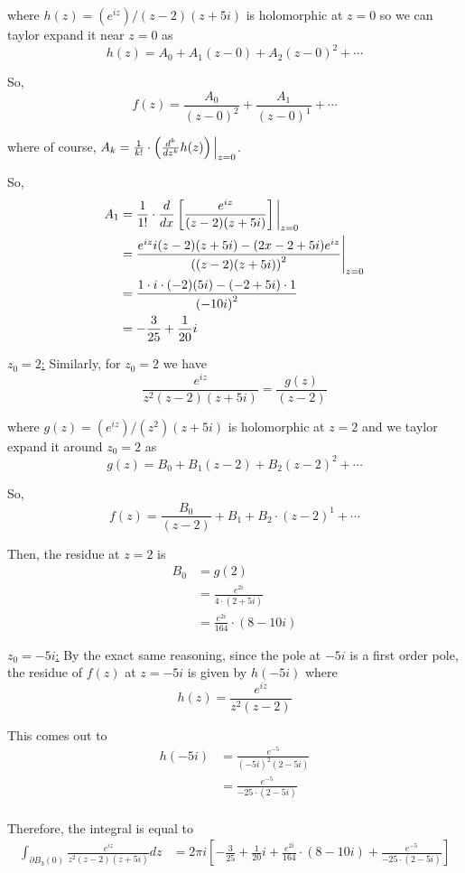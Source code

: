 \documentclass{article}
\newcommand{\restr}[2]{{%
  \left.\kern-\nulldelimiterspace %
  #1 %
  \vphantom{\big|} %
  \right|_{#2} %
  }}
\begin{document}
where $h(z) = (e^{iz}) / (z-2)(z+5i)$ is holomorphic at $z = 0$ so we can taylor expand it near $z = 0$ as 
\[ h(z) = A_0 + A_1(z-0) + A_2(z-0)^2 + \cdots \]

So, 
\[ f(z) = \frac{A_0}{(z-0)^2} + \frac{A_1}{(z-0)^1} + \cdots \]

where of course, $A_k = \restr{\frac{1}{k!} \cdot \left(\frac{d^k}{dz^k} h(z)\right)}{z = 0}$. 

\vskip 0.5cm
So, 
\begin{align*}
  A_1 &= \frac{1}{1!} \cdot \restr{\frac{d}{dx} \left[ \frac{e^{iz}}{(z-2)(z+5i)} \right] }{z = 0} \\
  &= \restr{\frac{e^{iz} i(z-2)(z+5i) - (2x - 2 + 5i)e^{iz}}{\left( (z-2)(z+5i) \right)^2}}{z = 0} \\
  &= \frac{1\cdot i\cdot(-2)(5i) - (-2 + 5i)\cdot1}{\left(-10i\right)^2} \\
  &= -\frac{3}{25} + \frac{1}{20}i
\end{align*}


\vskip 1cm
\underline{$z_0 = 2$:} Similarly, for $z_0 = 2$ we have 
\[ \frac{e^{iz}}{z^2(z-2)(z+5i)} = \frac{g(z)}{(z-2)} \]

where $g(z) = (e^{iz})/(z^2)(z+5i)$ is holomorphic at $z = 2$ and we taylor expand it around $z_0 = 2$ as 
\[  g(z) = B_0 + B_1 (z-2) + B_2 (z-2)^2 + \cdots  \]

So,
\[ f(z) = \frac{B_0}{(z-2)} + B_1 + B_2 \cdot (z-2)^1 + \cdots  \]

Then, the residue at $z = 2$ is
\begin{align*}
  B_0 &= g(2) \\
  &= \frac{e^{2i}}{4 \cdot (2+5i)} \\
  &= \frac{e^{2i}}{164} \cdot \left(8 - 10i\right)
\end{align*}

\vskip 0.5cm
\underline{$z_0 = -5i$:}
By the exact same reasoning, since the pole at $-5i$ is a first order pole, the residue of $f(z)$ at $z = -5i$ is given by $h(-5i)$ where 
\[ h(z) = \frac{e^{iz}}{z^2 (z-2)} \] 

This comes out to 
\begin{align*}
  h(-5i) &= \frac{e^{-5}}{(-5i)^2 \left(2 - 5i\right)} \\
  &= \frac{e^{-5}}{-25 \cdot \left(2 - 5i\right)} \\
\end{align*}

Therefore, the integral is equal to 
\begin{align*}
  \int_{\partial B_3(0)} \frac{e^{iz}}{z^2 (z-2)(z+5i)} dz &= 2\pi i \left[ -\frac{3}{25} + \frac{1}{20}i + \frac{e^{2i}}{164} \cdot \left(8 - 10i\right) +  \frac{e^{-5}}{-25 \cdot \left(2 - 5i\right)}  \right] \\
\end{align*}
\end{document}
